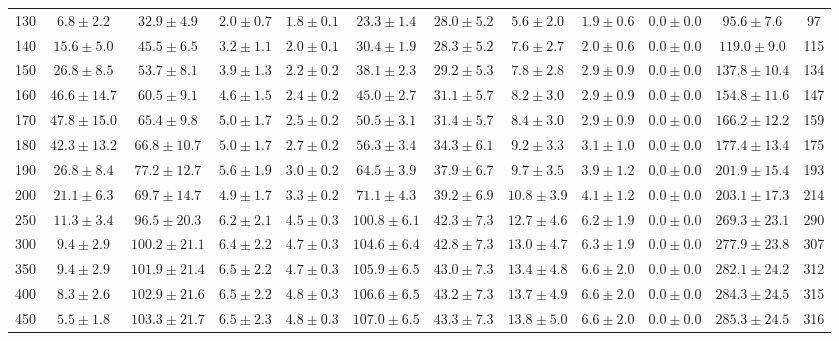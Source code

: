 \begin{table}[!ht]
{\begin{center}
\begin{tabular}{l c c c c c c c c c c c }
130 & $6.8\pm2.2$ & $32.9\pm4.9$ & $2.0\pm0.7$ & $1.8\pm0.1$ & $23.3\pm1.4$ & $28.0\pm5.2$ & $5.6\pm2.0$ & $1.9\pm0.6$ & $0.0\pm0.0$ & $95.6\pm7.6$ & 97 \\
140 & $15.6\pm5.0$ & $45.5\pm6.5$ & $3.2\pm1.1$ & $2.0\pm0.1$ & $30.4\pm1.9$ & $28.3\pm5.2$ & $7.6\pm2.7$ & $2.0\pm0.6$ & $0.0\pm0.0$ & $119.0\pm9.0$ & 115 \\
150 & $26.8\pm8.5$ & $53.7\pm8.1$ & $3.9\pm1.3$ & $2.2\pm0.2$ & $38.1\pm2.3$ & $29.2\pm5.3$ & $7.8\pm2.8$ & $2.9\pm0.9$ & $0.0\pm0.0$ & $137.8\pm10.4$ & 134 \\
160 & $46.6\pm14.7$ & $60.5\pm9.1$ & $4.6\pm1.5$ & $2.4\pm0.2$ & $45.0\pm2.7$ & $31.1\pm5.7$ & $8.2\pm3.0$ & $2.9\pm0.9$ & $0.0\pm0.0$ & $154.8\pm11.6$ & 147 \\
170 & $47.8\pm15.0$ & $65.4\pm9.8$ & $5.0\pm1.7$ & $2.5\pm0.2$ & $50.5\pm3.1$ & $31.4\pm5.7$ & $8.4\pm3.0$ & $2.9\pm0.9$ & $0.0\pm0.0$ & $166.2\pm12.2$ & 159 \\
180 & $42.3\pm13.2$ & $66.8\pm10.7$ & $5.0\pm1.7$ & $2.7\pm0.2$ & $56.3\pm3.4$ & $34.3\pm6.1$ & $9.2\pm3.3$ & $3.1\pm1.0$ & $0.0\pm0.0$ & $177.4\pm13.4$ & 175 \\
190 & $26.8\pm8.4$ & $77.2\pm12.7$ & $5.6\pm1.9$ & $3.0\pm0.2$ & $64.5\pm3.9$ & $37.9\pm6.7$ & $9.7\pm3.5$ & $3.9\pm1.2$ & $0.0\pm0.0$ & $201.9\pm15.4$ & 193 \\
200 & $21.1\pm6.3$ & $69.7\pm14.7$ & $4.9\pm1.7$ & $3.3\pm0.2$ & $71.1\pm4.3$ & $39.2\pm6.9$ & $10.8\pm3.9$ & $4.1\pm1.2$ & $0.0\pm0.0$ & $203.1\pm17.3$ & 214 \\
250 & $11.3\pm3.4$ & $96.5\pm20.3$ & $6.2\pm2.1$ & $4.5\pm0.3$ & $100.8\pm6.1$ & $42.3\pm7.3$ & $12.7\pm4.6$ & $6.2\pm1.9$ & $0.0\pm0.0$ & $269.3\pm23.1$ & 290 \\
300 & $9.4\pm2.9$ & $100.2\pm21.1$ & $6.4\pm2.2$ & $4.7\pm0.3$ & $104.6\pm6.4$ & $42.8\pm7.3$ & $13.0\pm4.7$ & $6.3\pm1.9$ & $0.0\pm0.0$ & $277.9\pm23.8$ & 307 \\
350 & $9.4\pm2.9$ & $101.9\pm21.4$ & $6.5\pm2.2$ & $4.7\pm0.3$ & $105.9\pm6.5$ & $43.0\pm7.3$ & $13.4\pm4.8$ & $6.6\pm2.0$ & $0.0\pm0.0$ & $282.1\pm24.2$ & 312 \\
400 & $8.3\pm2.6$ & $102.9\pm21.6$ & $6.5\pm2.2$ & $4.8\pm0.3$ & $106.6\pm6.5$ & $43.2\pm7.3$ & $13.7\pm4.9$ & $6.6\pm2.0$ & $0.0\pm0.0$ & $284.3\pm24.5$ & 315 \\
450 & $5.5\pm1.8$ & $103.3\pm21.7$ & $6.5\pm2.3$ & $4.8\pm0.3$ & $107.0\pm6.5$ & $43.3\pm7.3$ & $13.8\pm5.0$ & $6.6\pm2.0$ & $0.0\pm0.0$ & $285.3\pm24.5$ & 316 \\

\end{tabular}
\end{center}}
\end{table}
